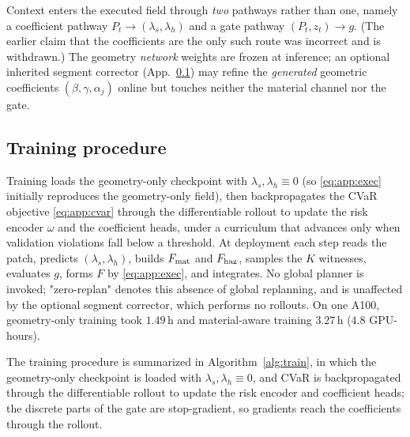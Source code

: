 Context enters the executed field through \emph{two} pathways rather than one, namely a coefficient pathway $P_t\!\to\!(\lambda_s,\lambda_h)$ and a gate pathway $(P_t,z_t)\!\to\!g$. (The earlier claim that the coefficients are the only such route was incorrect and is withdrawn.) The geometry \emph{network} weights are frozen at inference; an optional inherited segment corrector (App.~\ref{app:loops}) may refine the \emph{generated} geometric coefficients $(\beta,\gamma,\alpha_j)$ online but touches neither the material channel nor the gate. 

\subsection{Training procedure}
\label{app:loops}
Training loads the geometry-only checkpoint with $\lambda_s,\lambda_h\equiv0$ (so \eqref{eq:app:exec} initially reproduces the geometry-only field), then backpropagates the CVaR objective \eqref{eq:app:cvar} through the differentiable rollout to update the risk encoder $\omega$ and the coefficient heads, under a curriculum that advances only when validation violations fall below a threshold. At deployment each step reads the patch, predicts $(\lambda_s,\lambda_h)$, builds $F_{\rm mat}$ and $F_{\rm haz}$, samples the $K$ witnesses, evaluates $g$, forms $F$ by \eqref{eq:app:exec}, and integrates. No global planner is invoked; "zero-replan" denotes this absence of global replanning, and is unaffected by the optional segment corrector, which performs no rollouts. On one A100, geometry-only training took $1.49$\,h and material-aware training $3.27$\,h ($4.8$ GPU-hours).

The training procedure is summarized in Algorithm~\ref{alg:train}, in which the geometry-only checkpoint is loaded with $\lambda_s,\lambda_h\equiv0$, and CVaR is backpropagated through the differentiable rollout to update the risk encoder and coefficient heads; the discrete parts of the gate are stop-gradient, so gradients reach the coefficients through the rollout.
 
